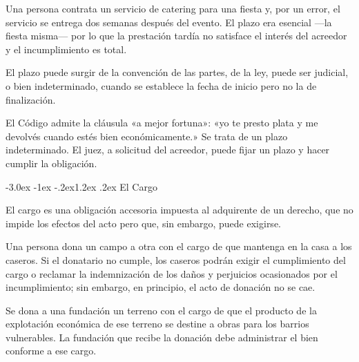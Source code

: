 \documentclass[12pt,oneside]{book}
\makeatletter
\renewcommand\section{\@startsection{section}{1}{\z@}%
  {-3.0ex \@plus -1ex \@minus -.2ex}{1.2ex \@plus .2ex}%
  {\normalfont\large\bfseries\color{acento}}}
\makeatother
\begin{document}
\begin{ejemplo}
Una persona contrata un servicio de catering para una fiesta y, por un error, el servicio se entrega dos semanas después del evento. El plazo era esencial ---la fiesta misma--- por lo que la prestación tardía no satisface el interés del acreedor y el incumplimiento es total.
\end{ejemplo}

El plazo puede surgir de la convención de las partes, de la ley, puede ser judicial, o bien indeterminado, cuando se establece la fecha de inicio pero no la de finalización.

\begin{regla}
El Código admite la cláusula «a mejor fortuna»: «yo te presto plata y me devolvés cuando estés bien económicamente.» Se trata de un plazo indeterminado. El juez, a solicitud del acreedor, puede fijar un plazo y hacer cumplir la obligación.
\end{regla}

\section{El Cargo}

\begin{definicion}[{Cargo}]
El cargo es una obligación accesoria impuesta al adquirente de un derecho, que no impide los efectos del acto pero que, sin embargo, puede exigirse.
\end{definicion}

\begin{ejemplo}
Una persona dona un campo a otra con el cargo de que mantenga en la casa a los caseros. Si el donatario no cumple, los caseros podrán exigir el cumplimiento del cargo o reclamar la indemnización de los daños y perjuicios ocasionados por el incumplimiento; sin embargo, en principio, el acto de donación no se cae.
\end{ejemplo}

\begin{ejemplo}
Se dona a una fundación un terreno con el cargo de que el producto de la explotación económica de ese terreno se destine a obras para los barrios vulnerables. La fundación que recibe la donación debe administrar el bien conforme a ese cargo.
\end{ejemplo}
\end{document}
